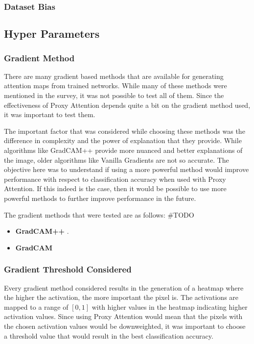 \subsubsection{Dataset Bias}

\subsection{Hyper Parameters} \label{sec:hyperparameters}

\subsubsection{Gradient Method}
There are many gradient based methods that are available for generating attention maps from trained networks. While many of these methods were mentioned in the survey, it was not possible to test all of them. Since the effectiveness of Proxy Attention depends quite a bit on the gradient method used, it was important to test them.

The important factor that was considered while choosing these methods was the difference in complexity and the power of explanation that they provide. While algorithms like GradCAM++ \cite{chattopadhayGradCAMGeneralizedGradientBased2018} provide more nuanced and better explanations of the image, older algorithms like Vanilla Gradients \cite{zeilerVisualizingUnderstandingConvolutional2013} are not so accurate. The objective here was to understand if using a more powerful method would improve performance with respect to classification accuracy when used with Proxy Attention. If this indeed is the case, then it would be possible to use more powerful methods to further improve performance in the future.

The gradient methods that were tested are as follows: \#TODO
\begin{itemize}
    \item \textbf{GradCAM++} \cite{chattopadhayGradCAMGeneralizedGradientBased2018}.
    \item \textbf{GradCAM} \cite{selvarajuGradCAMVisualExplanations}
\end{itemize}

\subsubsection{Gradient Threshold Considered}
Every gradient method considered results in the generation of a heatmap where the higher the activation, the more important the pixel is. The activations are mapped to a range of $[0,1]$ with higher values in the heatmap indicating higher activation values. Since using Proxy Attention would mean that the pixels with the chosen activation values would be downweighted, it was important to choose a threshold value that would result in the best classification accuracy.

